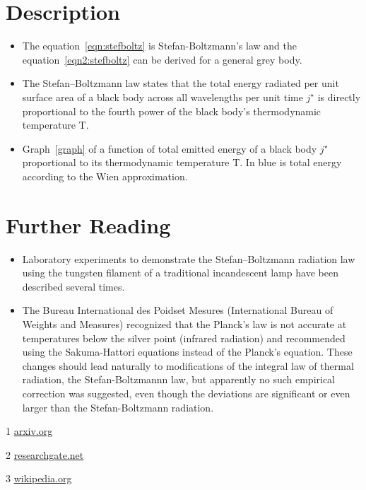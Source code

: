 \documentclass[a4paper, 12pt]{article}
\begin{document}
\section{Description}

\begin{itemize}

    \item The equation~\ref{eqn:stefboltz} is Stefan-Boltzmann's law and the equation~\ref{eqn2:stefboltz} can be derived for a general grey body.

    \item The Stefan–Boltzmann law states that the total energy radiated per unit surface area of a black body across all wavelengths per unit time $j^{\star}$ is directly proportional to the fourth power of the black body's thermodynamic temperature T.
    
    \item Graph~\ref{graph} of a function of total emitted energy of a black body $j^{\star}$ proportional to its thermodynamic temperature T. In blue is total energy according to the Wien approximation. 

\end{itemize}

\section{Further Reading}

\begin{itemize}

    \item Laboratory experiments to demonstrate the Stefan–Boltzmann radiation law using the tungsten filament of a traditional incandescent lamp have been described several times.~\cite{Marcello Carla}

    \item The Bureau International des Poidset Mesures (International Bureau of Weights and Measures) recognized that the Planck’s law is not accurate at temperatures below the silver point (infrared radiation) and recommended using the Sakuma-Hattori equations instead of the Planck’s equation. These changes should lead naturally to modifications of the integral law of thermal radiation, the Stefan-Boltzmannn law, but apparently no such empirical correction was suggested, even though the deviations are significant or even larger than the Stefan-Boltzmann radiation.~\cite{Yuri V. Gusev}
    
\end{itemize}




1 \href{https://arxiv.org/pdf/1612.03199.pdf}{arxiv.org}

2 \href{https://www.researchgate.net/publication/258757261_Stefan-Boltzmann_law_for_the_tungsten_filament_of_a_light_bulb_Revisiting_the_experiment/link/5954d3ea0f7e9b2da1b3b8ab/download}{researchgate.net}

3 \href{https://en.wikipedia.org/wiki/Stefan%E2%80%93Boltzmann_law}{wikipedia.org}
\end{document}
